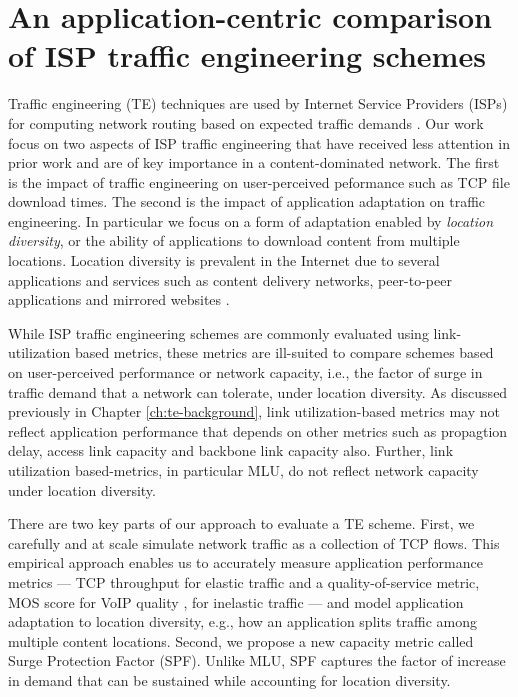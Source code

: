 \chapter{An application-centric comparison of ISP traffic engineering schemes}
\label{ch:beyondmlu}

Traffic engineering (TE) techniques are used by Internet Service Providers (ISPs) for computing network routing based on expected traffic demands \cite{rexford}. Our work focus on two aspects of ISP traffic engineering that have received less attention in prior work and are of key importance in a content-dominated network. The first is the impact of traffic engineering on user-perceived peformance such as TCP file download times. The second is the impact of application adaptation on traffic engineering. In particular we focus on a form of adaptation enabled by \emph{location diversity}, or the ability of applications to download content from multiple locations. Location diversity is prevalent in the Internet due to several applications and services such as content delivery networks, peer-to-peer applications and mirrored websites \cite{akamai-overview,bittorrent}.

While ISP traffic engineering schemes are commonly evaluated using link-utilization based metrics, these metrics are ill-suited to compare schemes based on user-perceived performance or network capacity, i.e., the factor of surge in traffic demand that a network can tolerate, under location diversity. As discussed previously in Chapter \ref{ch:te-background}, link utilization-based metrics may not reflect application performance that depends on other metrics such as propagtion delay, access link capacity and backbone link capacity also. Further, link utilization based-metrics, in particular MLU, do not reflect network capacity under location diversity. 

There are two key parts of our approach to evaluate a TE scheme. First, we carefully and at scale simulate network traffic as a collection of TCP flows. This empirical approach  enables us to accurately measure application performance metrics --- TCP throughput for elastic traffic and a quality-of-service metric,  MOS score for VoIP quality \cite{MOS-formula}, for inelastic traffic --- and model application adaptation to location diversity, e.g., how an application splits traffic among multiple content locations. Second, we propose a new capacity metric called Surge Protection Factor (SPF). Unlike MLU, SPF captures the factor of increase in demand that can be sustained while accounting for location diversity.

